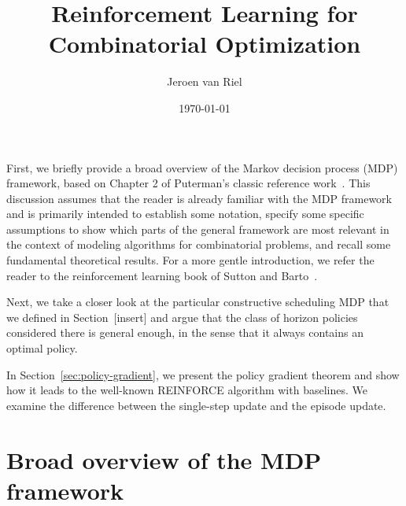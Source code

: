 \documentclass[11pt,a4paper]{article}
\title{Reinforcement Learning for Combinatorial Optimization}
\author{Jeroen van Riel}
\date{\today}
\theoremstyle{remark}
\newcommand\note[1]{{\color{Navy}\noindent\scriptsize#1}}
\begin{document}
\maketitle
\bigskip

\noindent
First, we briefly provide a broad overview of the Markov decision process (MDP)
framework, based on Chapter 2 of Puterman's classic reference
work~\cite{putermanMarkovDecisionProcesses2009}.
%
This discussion assumes that the reader is already familiar with the MDP
framework and is primarily intended to establish some notation, specify some
specific assumptions to show which parts of the general framework are most
relevant in the context of modeling algorithms for combinatorial problems, and
recall some fundamental theoretical results.
%
For a more gentle introduction, we refer the reader to the reinforcement
learning book of Sutton and
Barto~\cite{suttonReinforcementLearningIntroduction2018}.

Next, we take a closer look at the particular constructive scheduling MDP that
we defined in Section~\note{[insert]} and argue that the class of horizon
policies considered there is general enough, in the sense that it always
contains an optimal policy.

In Section~\ref{sec:policy-gradient}, we present the policy gradient theorem and
show how it leads to the well-known REINFORCE algorithm with baselines.
%
We examine the difference between the single-step update and the episode update.


\section{Broad overview of the MDP framework}\label{sec:broad-MDP}
\end{document}
